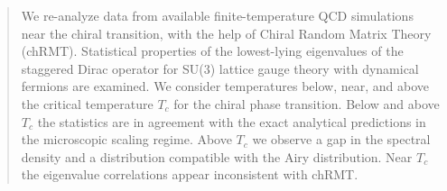 \begin{abstract}
We re-analyze data from available finite-temperature QCD  simulations near the
chiral transition, with the help of Chiral Random Matrix Theory (chRMT). 
Statistical properties of the lowest-lying eigenvalues  of the staggered Dirac
operator for SU(3) lattice gauge theory with dynamical fermions are examined.
We consider temperatures below, near, and above the critical temperature $T_c$
for the chiral phase transition. Below and above $T_c$ the statistics are in
agreement with the exact  analytical predictions in the microscopic scaling
regime. Above $T_c$ we observe a gap in the spectral density and a distribution
compatible with the Airy distribution. Near $T_c$ the eigenvalue correlations
appear inconsistent with chRMT. 
\end{abstract}

